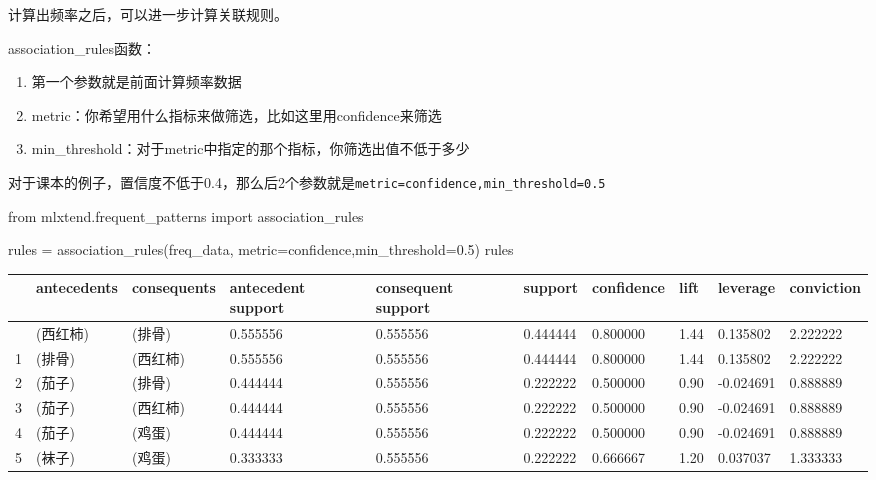 \documentclass[
  letterpaper,
  DIV=11,
  numbers=noendperiod]{scrreprt}
\newenvironment{Shaded}{\begin{snugshade}}{\end{snugshade}}
\newcommand{\FloatTok}[1]{\textcolor[rgb]{0.68,0.00,0.00}{#1}}
\newcommand{\ImportTok}[1]{\textcolor[rgb]{0.00,0.46,0.62}{#1}}
\newcommand{\NormalTok}[1]{\textcolor[rgb]{0.00,0.23,0.31}{#1}}
\newcommand{\OperatorTok}[1]{\textcolor[rgb]{0.37,0.37,0.37}{#1}}
\newcommand{\StringTok}[1]{\textcolor[rgb]{0.13,0.47,0.30}{#1}}
\providecommand{\tightlist}{%
  \setlength{\itemsep}{0pt}\setlength{\parskip}{0pt}}\usepackage{longtable,booktabs,array}
\begin{document}
计算出频率之后，可以进一步计算关联规则。

association\_rules函数：

\begin{enumerate}
\def\labelenumi{\arabic{enumi}.}
\tightlist
\item
  第一个参数就是前面计算频率数据
\item
  metric：你希望用什么指标来做筛选，比如这里用confidence来筛选
\item
  min\_threshold：对于metric中指定的那个指标，你筛选出值不低于多少
\end{enumerate}

对于课本的例子，置信度不低于0.4，那么后2个参数就是\texttt{metric=\textquotesingle{}confidence\textquotesingle{},min\_threshold=0.5}

\begin{Shaded}
\begin{Highlighting}[]
\ImportTok{from}\NormalTok{ mlxtend.frequent\_patterns }\ImportTok{import}\NormalTok{ association\_rules}

\NormalTok{rules }\OperatorTok{=}\NormalTok{ association\_rules(freq\_data, metric}\OperatorTok{=}\StringTok{\textquotesingle{}confidence\textquotesingle{}}\NormalTok{,min\_threshold}\OperatorTok{=}\FloatTok{0.5}\NormalTok{)}
\NormalTok{rules}
\end{Highlighting}
\end{Shaded}

\begin{longtable}[]{@{}llllllllll@{}}
\toprule\noalign{}
& antecedents & consequents & antecedent support & consequent support &
support & confidence & lift & leverage & conviction \\
\midrule\noalign{}
\endhead
\bottomrule\noalign{}
\endlastfoot
0 & (西红柿) & (排骨) & 0.555556 & 0.555556 & 0.444444 & 0.800000 & 1.44
& 0.135802 & 2.222222 \\
1 & (排骨) & (西红柿) & 0.555556 & 0.555556 & 0.444444 & 0.800000 & 1.44
& 0.135802 & 2.222222 \\
2 & (茄子) & (排骨) & 0.444444 & 0.555556 & 0.222222 & 0.500000 & 0.90 &
-0.024691 & 0.888889 \\
3 & (茄子) & (西红柿) & 0.444444 & 0.555556 & 0.222222 & 0.500000 & 0.90
& -0.024691 & 0.888889 \\
4 & (茄子) & (鸡蛋) & 0.444444 & 0.555556 & 0.222222 & 0.500000 & 0.90 &
-0.024691 & 0.888889 \\
5 & (袜子) & (鸡蛋) & 0.333333 & 0.555556 & 0.222222 & 0.666667 & 1.20 &
0.037037 & 1.333333 \\
\end{longtable}
\end{document}
